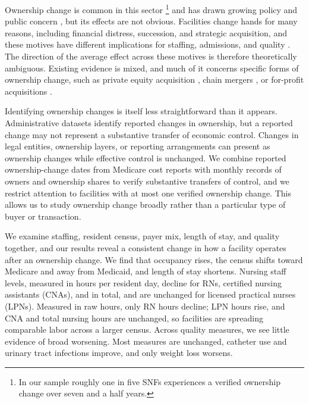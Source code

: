 \documentclass[12pt]{article}
\begin{document}
Ownership change is common in this sector \citep{prusynski_humbert_mroz_2023, OliveiraBlanco2024}\footnote{In our sample roughly one in five SNFs experiences a verified ownership change over seven and a half years.} and has drawn growing policy \citep{Khan2024PrivateCapital,MurphyScanlon2026} and public concern \citep{AFREF2026PEPolling, HealthcareDive2025PEReport}, but its effects are not obvious. Facilities change hands for many reasons, including financial distress, succession, and strategic acquisition, and these motives have different implications for staffing, admissions, and quality \citep{bowblis_2011, lu_lu_2022}. The direction of the average effect across these motives is therefore theoretically ambiguous. Existing evidence is mixed, and much of it concerns specific forms of ownership change, such as private equity acquisition \citep{GuptaEtAl2024, NBERw34306}, chain mergers \citep{Hirth2019EffectsOfChains, Grabowski2016LowQualityNH}, or for-profit acquisitions \citep{grabowski_stevenson_2008, sutton_et_al_2024}.

Identifying ownership changes is itself less straightforward than it appears. Administrative datasets identify reported changes in ownership, but a reported change may not represent a substantive transfer of economic control. Changes in legal entities, ownership layers, or reporting arrangements can present as ownership changes while effective control is unchanged. We combine reported ownership-change dates from Medicare cost reports with monthly records of owners and ownership shares to verify substantive transfers of control, and we restrict attention to facilities with at most one verified ownership change. This allows us to study ownership change broadly rather than a particular type of buyer or transaction.

We examine staffing, resident census, payer mix, length of stay, and quality together, and our results reveal a consistent change in how a facility operates after an ownership change. We find that occupancy rises, the census shifts toward Medicare and away from Medicaid, and length of stay shortens. Nursing staff levels, measured in hours per resident day, decline for RNs, certified nursing assistants (CNAs), and in total, and are unchanged for licensed practical nurses (LPNs). Measured in raw hours, only RN hours decline; LPN hours rise, and CNA and total nursing hours are unchanged, so facilities are spreading comparable labor across a larger census. Across quality measures, we see little evidence of broad worsening. Most measures are unchanged, catheter use and urinary tract infections improve, and only weight loss worsens.
\end{document}
